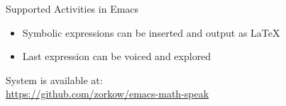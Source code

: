 \documentclass[final,hyperref={pdfpagelabels=false}]{beamer}
\begin{document}
\begin{frame}{}
\begin{columns}[t]
\begin{column}{.32\linewidth}
\begin{block}{\Large Supported Activities in Emacs}
\begin{itemize}
          \begin{itemize}
          \item Symbolic expressions can be inserted and output as {\LaTeX}
          \item Last expression can be voiced and explored
          \end{itemize}
        \end{itemize}
        System is available at:\\
        \textcolor{red}{\url{https://github.com/zorkow/emacs-math-speak}}
      \end{block}
    \end{column}
  \end{columns}
\end{frame}
\end{document}
